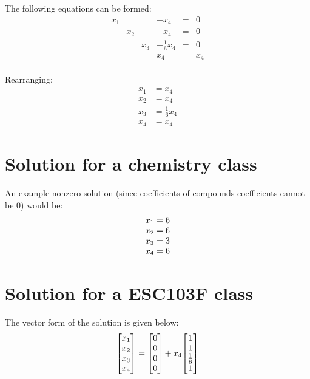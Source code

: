 \documentclass[11pt]{article}
\begin{document}
The following equations can be formed:
\begin{equation*}
    \begin{array}{cccccc}
        x_1 & & & -x_4 & =  & 0\\
        & x_2 & & -x_4 & = & 0\\
        & & x_3 & -\frac{1}{6}x_4 & = & 0\\
        & & & x_4 & = & x_4\\
    \end{array}
\end{equation*}

Rearranging:
\begin{align*}
    x_1 &= x_4 \\
    x_2 &= x_4 \\
    x_3 &= \frac{1}{6}x_4 \\
    x_4 &= x_4
\end{align*}

\section{Solution for a chemistry class}
An example nonzero solution (since coefficients of compounds coefficients cannot be 0) would be:
\begin{equation*}
    \begin{array}{@{}c@{}}
        x_1 = 6 \\
        x_2 = 6 \\
        x_3 = 3 \\
        x_4 = 6
    \end{array}
\end{equation*}

\section{Solution for a ESC103F class}
The vector form of the solution is given below:
\begin{align*}
    \left[
        \begin{array}{@{}c@{}}
            x_1\\
            x_2\\
            x_3\\
            x_4
        \end{array}
    \right] =
    \left[
        \begin{array}{@{}c@{}}
            0 \\
            0 \\
            0 \\
            0
        \end{array}
    \right] +
    x_4\!\left[
        \begin{array}{@{}c@{}}
            1 \\
            1 \\
            \frac{1}{6} \\
            1
        \end{array}
    \right]
\end{align*}
\end{document}
